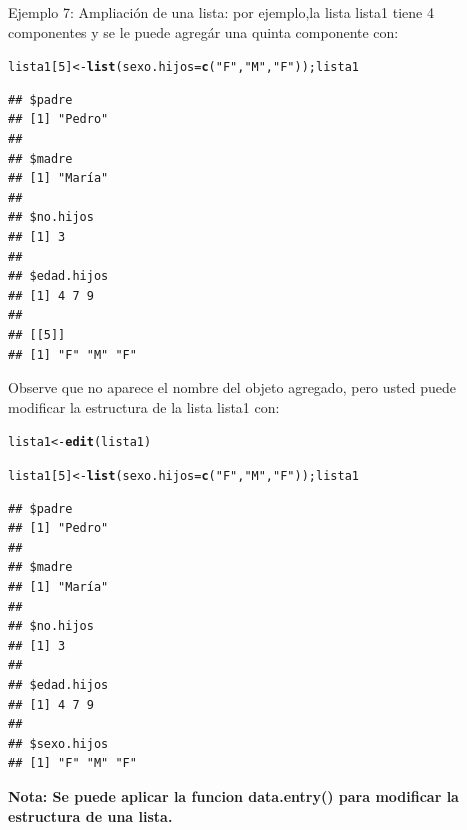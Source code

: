 \documentclass[12pt,letterpaper]{article}\usepackage[]{graphicx}\usepackage[]{color}
\makeatletter
\newcommand{\hlnum}[1]{\textcolor[rgb]{0.686,0.059,0.569}{#1}}%
\newcommand{\hlstr}[1]{\textcolor[rgb]{0.192,0.494,0.8}{#1}}%
\newcommand{\hlstd}[1]{\textcolor[rgb]{0.345,0.345,0.345}{#1}}%
\newcommand{\hlkwb}[1]{\textcolor[rgb]{0.69,0.353,0.396}{#1}}%
\newcommand{\hlkwc}[1]{\textcolor[rgb]{0.333,0.667,0.333}{#1}}%
\newcommand{\hlkwd}[1]{\textcolor[rgb]{0.737,0.353,0.396}{\textbf{#1}}}%
\newenvironment{kframe}{%
 \def\at@end@of@kframe{}%
 \ifinner\ifhmode%
  \def\at@end@of@kframe{\end{minipage}}%
  \begin{minipage}{\columnwidth}%
 \fi\fi%
 \def\FrameCommand##1{\hskip\@totalleftmargin \hskip-\fboxsep
 \colorbox{shadecolor}{##1}\hskip-\fboxsep
     \hskip-\linewidth \hskip-\@totalleftmargin \hskip\columnwidth}%
 \MakeFramed {\advance\hsize-\width
   \@totalleftmargin\z@ \linewidth\hsize
   \@setminipage}}%
 {\par\unskip\endMakeFramed%
 \at@end@of@kframe}
\newenvironment{knitrout}{}{} %
\makeatother
\begin{document}
Ejemplo 7: Ampliaci\'on de una lista: por ejemplo,la lista lista1 tiene 4\\
componentes y se le puede agreg\'ar una quinta componente con:\\
\begin{knitrout}
\color{fgcolor}\begin{kframe}
\begin{alltt}
\hlstd{lista1[}\hlnum{5}\hlstd{]} \hlkwb{<-} \hlkwd{list}\hlstd{(}\hlkwc{sexo.hijos}\hlstd{=}\hlkwd{c}\hlstd{(}\hlstr{"F"}\hlstd{,} \hlstr{"M"}\hlstd{,} \hlstr{"F"}\hlstd{)); lista1}
\end{alltt}
\begin{verbatim}
## $padre
## [1] "Pedro"
## 
## $madre
## [1] "María"
## 
## $no.hijos
## [1] 3
## 
## $edad.hijos
## [1] 4 7 9
## 
## [[5]]
## [1] "F" "M" "F"
\end{verbatim}
\end{kframe}
\end{knitrout}

Observe que no aparece el nombre del objeto agregado, pero usted puede modificar la estructura de la lista lista1 con:
\begin{knitrout}
\color{fgcolor}\begin{kframe}
\begin{alltt}
\hlstd{lista1} \hlkwb{<-} \hlkwd{edit}\hlstd{(lista1)}
\end{alltt}
\end{kframe}
\end{knitrout}
\begin{knitrout}
\color{fgcolor}\begin{kframe}
\begin{alltt}
\hlstd{lista1[}\hlnum{5}\hlstd{]} \hlkwb{<-} \hlkwd{list}\hlstd{(}\hlkwc{sexo.hijos}\hlstd{=}\hlkwd{c}\hlstd{(}\hlstr{"F"}\hlstd{,} \hlstr{"M"}\hlstd{,} \hlstr{"F"}\hlstd{)); lista1}
\end{alltt}
\begin{verbatim}
## $padre
## [1] "Pedro"
## 
## $madre
## [1] "María"
## 
## $no.hijos
## [1] 3
## 
## $edad.hijos
## [1] 4 7 9
## 
## $sexo.hijos
## [1] "F" "M" "F"
\end{verbatim}
\end{kframe}
\end{knitrout}

\textbf{Nota: Se puede aplicar la funcion data.entry() para modificar la estructura de una lista.}\\
\end{document}
